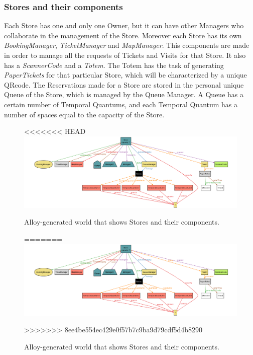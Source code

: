\documentclass[a4paper, 12pt, oneside]{article}
\begin{document}
\begin{enumerate}[labelindent=20pt, label={UC.\arabic*}, itemindent=1em,leftmargin=!]
\subsubsection{Stores and their components}
Each Store has one and only one Owner, but it can have other Managers who collaborate in the management of the Store. Moreover each Store has its own \textit{BookingManager}, \textit{TicketManager} and \textit{MapManager}. This components are made in order to manage all the requests of Tickets and Visits for that Store. It also has a \textit{ScannerCode} and a \textit{Totem}. The Totem has the task of generating \textit{PaperTickets} for that particular Store, which will be characterized by a unique QRcode. The Reservations made for a Store are stored in the personal unique Queue of the Store, which is managed by the Queue Manager. A Queue has a certain number of Temporal Quantums, and each Temporal Quantum has a number of spaces equal to the capacity of the Store.
\begin{figure}[h!]
\centering
<<<<<<< HEAD
    \centering
    \includegraphics[height=0.23\textheight, scale=0.3, keepaspectratio]{img/alloy/alloy_store.png}
    \caption{Alloy-generated world that shows Stores and their components.}
    \label{alloy_stores}
=======
	\centering
  	\includegraphics[height=0.23\textheight, scale=0.3, keepaspectratio]{img/alloy/alloy_store.png}
	\caption{Alloy-generated world that shows Stores and their components.}
 	\label{alloy_stores}
>>>>>>> 8ee4be554ec429e0f57b7c9ba9d79cdf5d4b8290
\end{figure}


\end{enumerate}
\end{document}
